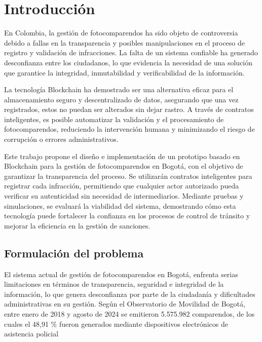\section{\large Introducción}
En Colombia, la gestión de fotocomparendos ha sido objeto de controversia debido a fallas en la transparencia y posibles manipulaciones en el proceso de registro y validación de infracciones. La falta de un sistema confiable ha generado desconfianza entre los ciudadanos, lo que evidencia la necesidad de una solución que garantice la integridad, inmutabilidad y verificabilidad de la información.

La tecnología Blockchain ha demostrado ser una alternativa eficaz para el almacenamiento seguro y descentralizado de datos, asegurando que una vez registrados, estos no puedan ser alterados sin dejar rastro. A través de contratos inteligentes, es posible automatizar la validación y el procesamiento de fotocomparendos, reduciendo la intervención humana y minimizando el riesgo de corrupción o errores administrativos.

Este trabajo propone el diseño e implementación de un prototipo basado en Blockchain para la gestión de fotocomparendos en Bogotá, con el objetivo de garantizar la transparencia del proceso. Se utilizarán contratos inteligentes para registrar cada infracción, permitiendo que cualquier actor autorizado pueda verificar su autenticidad sin necesidad de intermediarios. Mediante pruebas y simulaciones, se evaluará la viabilidad del sistema, demostrando cómo esta tecnología puede fortalecer la confianza en los procesos de control de tránsito y mejorar la eficiencia en la gestión de sanciones.

\subsection{Formulación del problema}
El sistema actual de gestión de fotocomparendos en Bogotá, enfrenta serias limitaciones en términos de transparencia, seguridad e integridad de la información, lo que genera desconfianza por parte de la ciudadanía y dificultades administrativas en su gestión. Según el Observatorio de Movilidad de Bogotá, entre enero de 2018 y agosto de 2024 se emitieron 5.575.982 comparendos, de los cuales el 48,91 \% fueron generados mediante dispositivos electrónicos de asistencia policial \parencite{ObservatorioComparendos2025}

